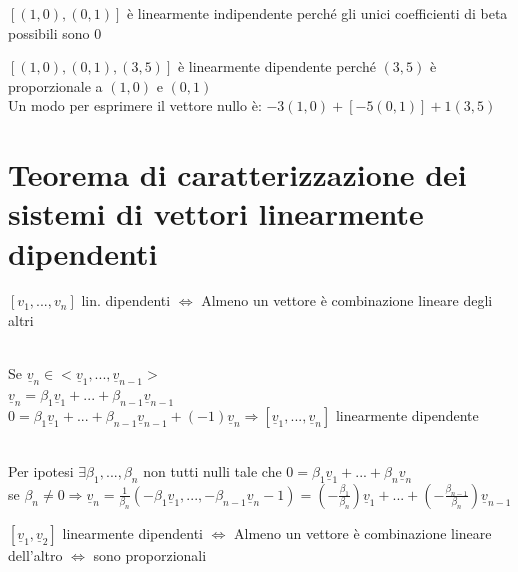 \begin{es}
	$[(1,0),(0,1)]$ è linearmente indipendente perché gli unici coefficienti di beta possibili sono 0
\end{es}

\begin{es}
	$[(1,0),(0,1),(3,5)]$ è linearmente dipendente perché $(3,5)$ è proporzionale a $(1,0)$ e $(0,1)$\\
	Un modo per esprimere il vettore nullo è: $-3(1,0)+[-5(0,1)]+1(3,5)$
\end{es}

\section{Teorema di caratterizzazione dei sistemi di vettori linearmente dipendenti}

\begin{teorema}\label{caratterizzazione}
	$[v_1,...,v_n]$ lin. dipendenti $\Longleftrightarrow $ Almeno un vettore è combinazione lineare degli altri\\
	\begin{dimostrazione}
		\phantom{}\\
		Se $\underline{v}_n\in <\underline{v}_1,...,\underline{v}_{n-1}>$\\
		$\underline{v}_n=\beta_1 \underline{v}_1+...+\beta_{n-1} \underline{v}_{n-1}$\\
		$0=\beta_1 \underline{v}_1+...+\beta_{n-1}\underline{v}_{n-1}+(-1)\underline{v}_n \Longrightarrow [\underline{v}_1,...,\underline{v}_n]$ linearmente dipendente 
	\end{dimostrazione}
	\begin{dimostrazione}
		\phantom{}\\
		Per ipotesi $\exists\beta_1,...,\beta_n$ non tutti nulli tale che $0=\beta_1 \underline{v}_1+...+\beta_n \underline{v}_n$\\
		se $\beta_n\neq 0\Longrightarrow  \underline{v}_n=\frac{1}{\beta_n}(-\beta_1 \underline{v}_1,...,-\beta_{n-1}\underline{v}_n-1)=(-\frac{\beta_1}{\beta_n})\underline{v}_1+...+(-\frac{\beta_{n-1}}{\beta_n})\underline{v}_{n-1}$
	\end{dimostrazione}
\end{teorema}

\begin{corollario}
	$[\underline{v}_1,\underline{v}_2]$ linearmente dipendenti $\Longleftrightarrow$ Almeno un vettore è combinazione lineare dell'altro $\Longleftrightarrow $ sono proporzionali
\end{corollario}

